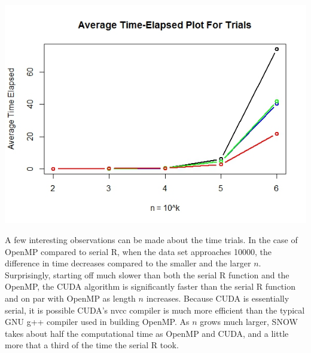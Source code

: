 \begin{center} \includegraphics[scale=.5]{times.jpeg} \end{center}


A few interesting observations can be made about the time trials. In the case of OpenMP compared to serial R, when the data set approaches 10000, the difference in time decreases compared to the smaller and the larger $n$. Surprisingly, starting off much slower than both the serial R function and the OpenMP, the CUDA algorithm is significantly faster than the serial R function and on par with OpenMP as length $n$ increases. Because CUDA is essentially serial, it is possible CUDA's nvcc compiler is much more efficient than the typical GNU g++ compiler used in building OpenMP. As $n$ grows much larger, SNOW takes about half the computational time as OpenMP and CUDA, and a little more that a third of the time the serial R took.
